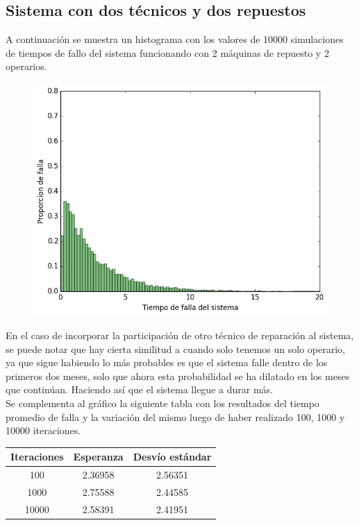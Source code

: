 \documentclass[10pt,a4paper]{article} %
\begin{document}
    \subsection{Sistema con dos t\'ecnicos y dos repuestos}
    A continuaci\'on se muestra un histograma con los valores de 10000 simulaciones de tiempos de fallo del sistema funcionando con 2 m\'aquinas de repuesto y 2 operarios.
    \begin {figure}[!htb]
    \centering
    \includegraphics[width=12cm] {img/2op2rep}
    \end {figure}

    En el caso de incorporar la participaci\'on de otro t\'ecnico de reparaci\'on al sistema, se puede notar que hay cierta similitud a cuando solo tenemos un solo operario, ya que sigue habiendo lo m\'as probables es que el sistema falle dentro de los primeros dos meses, solo que ahora esta probabilidad se ha dilatado en los meses que contin\'uan. Haciendo as\'i que el sistema llegue a durar m\'as. \\
    Se complementa al gr\'afico la siguiente tabla con los resultados del tiempo promedio de falla y la variaci\'on del mismo luego de haber realizado 100, 1000 y 10000 iteraciones.
    
    \begin{center}
        \begin{tabular}{ c| c| c}
            Iteraciones & Esperanza & Desv\'io est\'andar \\ \hline
            100&    2.36958 & 2.56351  \\ \hline
            1000&   2.75588 & 2.44585  \\ \hline
            10000&  2.58391 & 2.41951  \\ \hline
        \end{tabular}
    \end{center}
\end{document}
